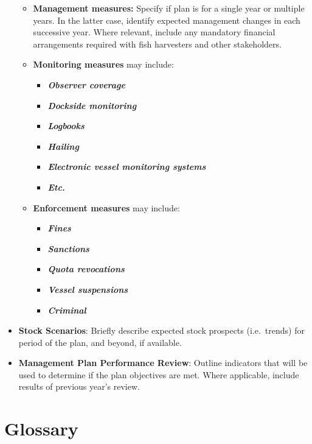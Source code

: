 \documentclass[]{book}
\begin{document}
\begin{itemize}
  \begin{itemize}
  \item
    \textbf{Management measures:} Specify if plan is for a single year
    or multiple years. In the latter case, identify expected management
    changes in each successive year. Where relevant, include any
    mandatory financial arrangements required with fish harvesters and
    other stakeholders.
  \item
    \textbf{Monitoring measures} may include:

    \begin{itemize}
    \item
      \textbf{\emph{Observer coverage }}
    \item
      \textbf{\emph{Dockside monitoring}}
    \item
      \textbf{\emph{Logbooks }}
    \item
      \textbf{\emph{Hailing}}
    \item
      \textbf{\emph{Electronic vessel monitoring systems}}
    \item
      \textbf{\emph{Etc.}}
    \end{itemize}
  \item
    \textbf{Enforcement measures} may include:

    \begin{itemize}
    \item
      \textbf{\emph{Fines}}
    \item
      \textbf{\emph{Sanctions}}
    \item
      \textbf{\emph{Quota revocations}}
    \item
      \textbf{\emph{Vessel suspensions}}
    \item
      \textbf{\emph{Criminal }}
    \end{itemize}
  \end{itemize}
\item
  \textbf{Stock Scenarios}: Briefly describe expected stock prospects
  (i.e.~trends) for period of the plan, and beyond, if available.
\item
  \textbf{Management Plan Performance Review}: Outline indicators that
  will be used to determine if the plan objectives are met. Where
  applicable, include results of previous year's review.
\end{itemize}

\chapter{Glossary}\label{glossary}
\end{document}
